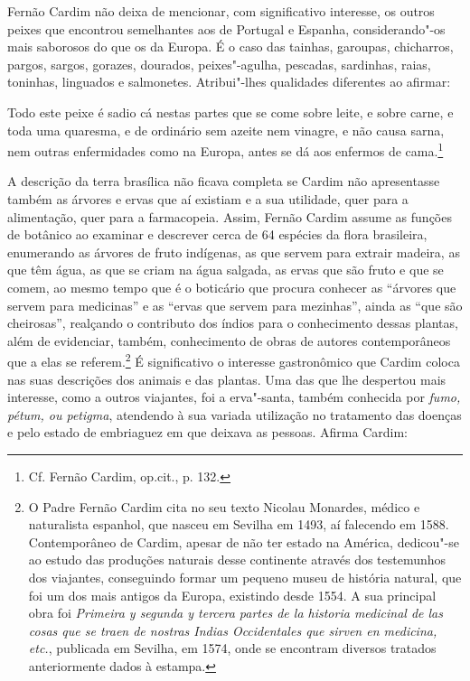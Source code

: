 Fernão Cardim não deixa de mencionar, com significativo interesse, os
outros peixes que encontrou semelhantes aos de Portugal e Espanha,
considerando"-os mais saborosos do que os da Europa. É o caso das
tainhas, garoupas, chicharros, pargos, sargos, gorazes,
dourados, peixes"-agulha, pescadas, sardinhas, raias, toninhas, linguados
e salmonetes. Atribui"-lhes qualidades diferentes ao afirmar:

\begin{hedraquote}
Todo este peixe é sadio cá nestas partes que se come sobre
leite, e sobre carne, e toda uma quaresma, e de ordinário sem azeite
nem vinagre, e não causa sarna, nem outras enfermidades como na Europa,
antes se dá aos enfermos de cama.\footnote{ Cf. Fernão Cardim, op.cit., p. 132.} 
\end{hedraquote}

A descrição da terra brasílica não ficava completa se Cardim não
apresentasse também as árvores e ervas que aí existiam e a sua
utilidade, quer para a alimentação, quer para a farmacopeia. Assim,
Fernão Cardim assume as funções de botânico ao examinar e descrever
cerca de 64 espécies da flora brasileira, enumerando as
árvores de fruto indígenas, as que servem para extrair madeira, as que
têm água, as que se criam na água salgada, as ervas que são fruto e que
se comem, ao mesmo tempo que é o boticário que procura conhecer as
``árvores que servem para medicinas'' e as ``ervas que
servem para mezinhas'', ainda as ``que são cheirosas'', 
realçando o contributo dos índios para o conhecimento dessas plantas,
além de evidenciar, também, conhecimento de obras de autores
contemporâneos que a elas se referem.\footnote{ O Padre Fernão
Cardim cita no seu texto Nicolau Monardes, médico e naturalista
espanhol, que nasceu em Sevilha em 1493, aí falecendo em 1588.
Contemporâneo de Cardim, apesar de não ter estado na América,
dedicou"-se ao estudo das produções naturais desse continente através
dos testemunhos dos viajantes, conseguindo formar um pequeno museu de
história natural, que foi um dos mais antigos da Europa, existindo
desde 1554. A sua principal obra foi \textit{Primeira y segunda y
tercera partes de la historia medicinal de las cosas que se traen de
nostras Indias Occidentales que sirven en medicina, etc.}, publicada em
Sevilha, em 1574, onde se encontram diversos tratados anteriormente
dados à estampa.} É significativo o interesse gastronômico que Cardim
coloca nas suas descrições dos animais e das plantas. Uma das que lhe
despertou mais interesse, como a outros viajantes, foi a
erva"-santa, também conhecida por \textit{fumo, pétum, ou
petigma}, atendendo à sua variada utilização no tratamento das doenças
e pelo estado de embriaguez em que deixava as pessoas. Afirma Cardim:

